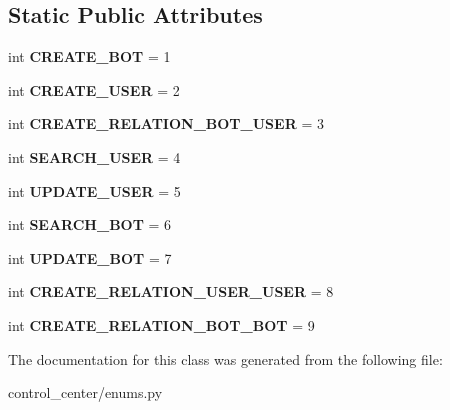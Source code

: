 \subsection*{Static Public Attributes}
\begin{DoxyCompactItemize}
\item 
\mbox{\label{classtwitter_1_1control__center_1_1enums_1_1Neo4jTypes_ae3c56fb299eefc1481a2fe63cfdaa5e5}} 
int {\bfseries C\+R\+E\+A\+T\+E\+\_\+\+B\+OT} = 1
\item 
\mbox{\label{classtwitter_1_1control__center_1_1enums_1_1Neo4jTypes_a85b26cfbccbc0a85c141db505dad2b7d}} 
int {\bfseries C\+R\+E\+A\+T\+E\+\_\+\+U\+S\+ER} = 2
\item 
\mbox{\label{classtwitter_1_1control__center_1_1enums_1_1Neo4jTypes_a6db78d0679448864cb2de85f154f66ff}} 
int {\bfseries C\+R\+E\+A\+T\+E\+\_\+\+R\+E\+L\+A\+T\+I\+O\+N\+\_\+\+B\+O\+T\+\_\+\+U\+S\+ER} = 3
\item 
\mbox{\label{classtwitter_1_1control__center_1_1enums_1_1Neo4jTypes_a380457ade6274f49db2b4cfb7d47370e}} 
int {\bfseries S\+E\+A\+R\+C\+H\+\_\+\+U\+S\+ER} = 4
\item 
\mbox{\label{classtwitter_1_1control__center_1_1enums_1_1Neo4jTypes_a5f49d6ff2bf0d62e4d95d5dbc1af44ff}} 
int {\bfseries U\+P\+D\+A\+T\+E\+\_\+\+U\+S\+ER} = 5
\item 
\mbox{\label{classtwitter_1_1control__center_1_1enums_1_1Neo4jTypes_a67e0a96c5d0c6c8c0f66f7d89924ab3b}} 
int {\bfseries S\+E\+A\+R\+C\+H\+\_\+\+B\+OT} = 6
\item 
\mbox{\label{classtwitter_1_1control__center_1_1enums_1_1Neo4jTypes_ad43693ab8b4f252b7eeccc9c09753593}} 
int {\bfseries U\+P\+D\+A\+T\+E\+\_\+\+B\+OT} = 7
\item 
\mbox{\label{classtwitter_1_1control__center_1_1enums_1_1Neo4jTypes_aba6f55ec115736865fe4fed5f20381bb}} 
int {\bfseries C\+R\+E\+A\+T\+E\+\_\+\+R\+E\+L\+A\+T\+I\+O\+N\+\_\+\+U\+S\+E\+R\+\_\+\+U\+S\+ER} = 8
\item 
\mbox{\label{classtwitter_1_1control__center_1_1enums_1_1Neo4jTypes_ae2db8b3836f9d22d972c1687e3e589b0}} 
int {\bfseries C\+R\+E\+A\+T\+E\+\_\+\+R\+E\+L\+A\+T\+I\+O\+N\+\_\+\+B\+O\+T\+\_\+\+B\+OT} = 9
\end{DoxyCompactItemize}


The documentation for this class was generated from the following file\+:\begin{DoxyCompactItemize}
\item 
control\+\_\+center/enums.\+py\end{DoxyCompactItemize}
